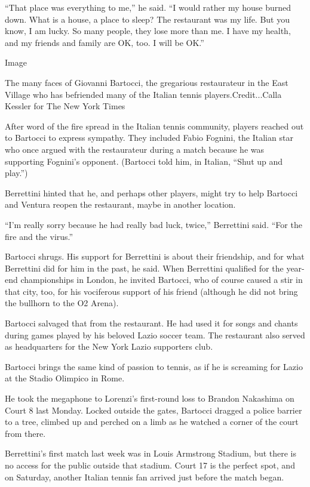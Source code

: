 ``That place was everything to me,'' he said. ``I would rather my house
burned down. What is a house, a place to sleep? The restaurant was my
life. But you know, I am lucky. So many people, they lose more than me.
I have my health, and my friends and family are OK, too. I will be OK.''

Image

The many faces of Giovanni Bartocci, the gregarious restaurateur in the
East Village who has befriended many of the Italian tennis
players.Credit...Calla Kessler for The New York Times

After word of the fire spread in the Italian tennis community, players
reached out to Bartocci to express sympathy. They included Fabio
Fognini, the Italian star who once argued with the restaurateur during a
match because he was supporting Fognini's opponent. (Bartocci told him,
in Italian, ``Shut up and play.'')

Berrettini hinted that he, and perhaps other players, might try to help
Bartocci and Ventura reopen the restaurant, maybe in another location.

``I'm really sorry because he had really bad luck, twice,'' Berrettini
said. ``For the fire and the virus.''

Bartocci shrugs. His support for Berrettini is about their friendship,
and for what Berrettini did for him in the past, he said. When
Berrettini qualified for the year-end championships in London, he
invited Bartocci, who of course caused a stir in that city, too, for his
vociferous support of his friend (although he did not bring the bullhorn
to the O2 Arena).

Bartocci salvaged that from the restaurant. He had used it for songs and
chants during games played by his beloved Lazio soccer team. The
restaurant also served as headquarters for the New York Lazio supporters
club.

Bartocci brings the same kind of passion to tennis, as if he is
screaming for Lazio at the Stadio Olimpico in Rome.

He took the megaphone to Lorenzi's first-round loss to Brandon Nakashima
on Court 8 last Monday. Locked outside the gates, Bartocci dragged a
police barrier to a tree, climbed up and perched on a limb as he watched
a corner of the court from there.

Berrettini's first match last week was in Louis Armstrong Stadium, but
there is no access for the public outside that stadium. Court 17 is the
perfect spot, and on Saturday, another Italian tennis fan arrived just
before the match began.

